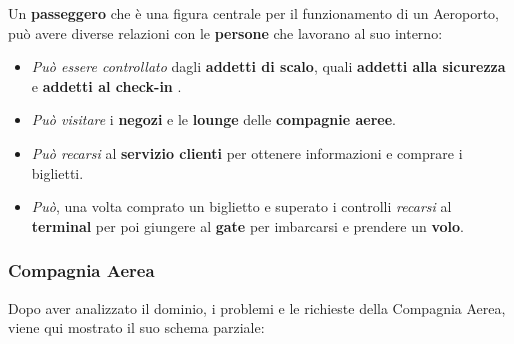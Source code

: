 \textsf{Un \textbf{passeggero} che è una figura centrale per il funzionamento di un Aeroporto, può avere diverse relazioni con le \textbf{persone} che lavorano al suo interno:}\\

\begin{itemize}
	\item \textsf{\small \emph{Può essere controllato} dagli \textbf{addetti di scalo}, quali \textbf{addetti alla sicurezza} e \textbf{addetti al check-in} .}\\
	\item \textsf{\small \emph{Può visitare} i \textbf{negozi} e le \textbf{lounge} delle \textbf{compagnie aeree}}.\\
	\item \textsf{\small \emph{Può recarsi} al \textbf{servizio clienti} per ottenere informazioni e comprare i biglietti.}\\
	\item \textsf{\small \emph{Può}, una volta comprato un biglietto e superato i controlli \emph{recarsi} al \textbf{terminal} per poi giungere al \textbf{gate} per imbarcarsi e prendere un \textbf{volo}.}\\
\end{itemize}



\newpage

\subsubsection{Compagnia Aerea}

\textsf{\small Dopo aver analizzato il dominio, i problemi e le richieste della Compagnia Aerea, viene qui mostrato il suo schema parziale:}

